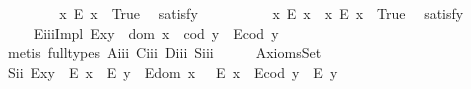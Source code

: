 \begin{isabellebody}
\ \ %
%
\endisatagproof
{\isafoldproof}%
%
\isadelimproof
%
\endisadelimproof
\isanewline
\ \ \ \isamarkupfalse%
\ \ {\isachardoublequoteopen}{\isasymexists}x{\isachardot}\ \isactrlbold {\isasymnot}{\isacharparenleft}E\ x{\isacharparenright}{\isachardoublequoteclose}\ \ True\ \isamarkupfalse%
\ {\isacharbrackleft}satisfy{\isacharbrackright}%
\isadelimproof
\ %
\endisadelimproof
%
\isatagproof
{}\isamarkupfalse%
\ \ %
%
\endisatagproof
{\isafoldproof}%
%
\isadelimproof
%
\endisadelimproof
\isanewline
\ \ \ \isamarkupfalse%
\ \ {\isachardoublequoteopen}{\isacharparenleft}{\isasymexists}x{\isachardot}\ \isactrlbold {\isasymnot}{\isacharparenleft}E\ x{\isacharparenright}{\isacharparenright}\ {\isasymand}\ {\isacharparenleft}{\isasymexists}x{\isachardot}\ {\isacharparenleft}E\ x{\isacharparenright}{\isacharparenright}{\isachardoublequoteclose}\ \ True\ \isamarkupfalse%
\ {\isacharbrackleft}satisfy{\isacharbrackright}%
\isadelimproof
\ %
\endisadelimproof
%
\isatagproof
{}\isamarkupfalse%
\ \ %
%
\endisatagproof
{\isafoldproof}%
%
\isadelimproof
%
\endisadelimproof
\isanewline
\isanewline
\ \ \ \isamarkupfalse%
\ E\isactrlsub i\isactrlsub i\isactrlsub iImpl{\isacharcolon}\ {\isachardoublequoteopen}E{\isacharparenleft}x{\isasymcdot}y{\isacharparenright}\ \isactrlbold {\isasymrightarrow}\ {\isacharparenleft}dom\ x\ {\isasymcong}\ cod\ y\ \isactrlbold {\isasymand}\ E{\isacharparenleft}cod\ y{\isacharparenright}{\isacharparenright}{\isachardoublequoteclose}%
\isadelimproof
\ %
\endisadelimproof
%
\isatagproof
{}\isamarkupfalse%
\ {\isacharparenleft}metis\ {\isacharparenleft}full{\isacharunderscore}types{\isacharparenright}\ A\isactrlsub i\isactrlsub i\isactrlsub i\ C\isactrlsub i\isactrlsub i\isactrlsub i\ D\isactrlsub i\isactrlsub i\isactrlsub i\ S\isactrlsub i\isactrlsub i\isactrlsub i{\isacharparenright}%
\endisatagproof
{\isafoldproof}%
%
\isadelimproof
%
\endisadelimproof
\isanewline
\ \ \isamarkupfalse%
%
\isamarkuptrue%
\ \isamarkupfalse%
\ AxiomsSet{}\isanewline
\ \ \isanewline
\ \ \ \isamarkupfalse%
\ S\isactrlsub i\isactrlsub i{\isacharcolon}\ {\isachardoublequoteopen}{\isacharparenleft}E{\isacharparenleft}x{\isasymcdot}y{\isacharparenright}\ \isactrlbold {\isasymrightarrow}\ {\isacharparenleft}E\ x\ \isactrlbold {\isasymand}\ E\ y{\isacharparenright}{\isacharparenright}\ \isactrlbold {\isasymand}\ {\isacharparenleft}E{\isacharparenleft}dom\ x\ {\isacharparenright}\ \isactrlbold {\isasymrightarrow}\ E\ x{\isacharparenright}\ \isactrlbold {\isasymand}\ {\isacharparenleft}E{\isacharparenleft}cod\ y{\isacharparenright}\ \isactrlbold {\isasymrightarrow}\ E\ y{\isacharparenright}{\isachardoublequoteclose}%

\end{isabellebody}

